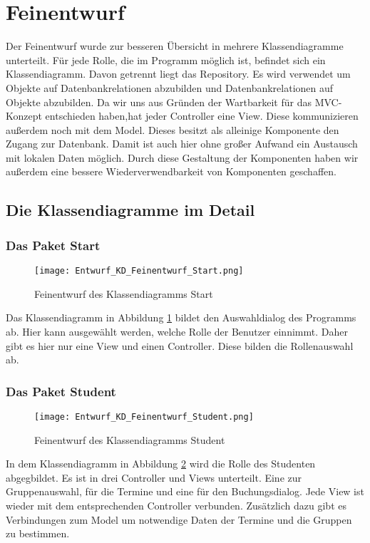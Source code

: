 \documentclass[a4paper,10pt]{article}
\begin{document}
  \newpage
\section{Feinentwurf}
Der Feinentwurf wurde zur besseren Übersicht in mehrere Klassendiagramme unterteilt. Für jede Rolle, die im Programm möglich ist, befindet sich ein Klassendiagramm.
Davon getrennt liegt das Repository. Es wird verwendet um Objekte auf Datenbankrelationen abzubilden und Datenbankrelationen auf Objekte abzubilden. Da wir uns aus Gründen der Wartbarkeit für das MVC-Konzept entschieden haben,hat jeder Controller eine View.
Diese kommunizieren außerdem noch mit dem Model. Dieses besitzt als alleinige Komponente den Zugang zur Datenbank. Damit ist auch hier ohne großer Aufwand ein Austausch mit lokalen Daten möglich.
Durch diese Gestaltung der Komponenten haben wir außerdem eine bessere Wiederverwendbarkeit von Komponenten geschaffen. 

 \subsection{Die Klassendiagramme im Detail}
 \subsubsection{Das Paket Start}
 
 \begin{figure}
  \texttt{[image: Entwurf\_KD\_Feinentwurf\_Start.png]}
  \label{fig:Klassendiagramm_Start}
  \caption{Feinentwurf des Klassendiagramms Start}
 \end{figure} 
 
 Das Klassendiagramm in Abbildung \ref{fig:Klassendiagramm_Start} bildet den Auswahldialog des Programms ab. Hier kann ausgewählt werden, welche Rolle der Benutzer einnimmt. 
 Daher gibt es hier nur eine View und einen Controller. Diese bilden die Rollenauswahl ab.
 \subsubsection{Das Paket Student}
 
 \begin{figure}
\texttt{[image: Entwurf\_KD\_Feinentwurf\_Student.png]}
\label{fig:Klassendiagramm_Student}
\caption{Feinentwurf des Klassendiagramms Student}
 \end{figure} 

 In dem Klassendiagramm in Abbildung \ref{fig:Klassendiagramm_Student} wird die Rolle des Studenten abgegbildet. Es ist in drei Controller und Views unterteilt. Eine zur Gruppenauswahl, für die Termine und eine für den Buchungsdialog.
 Jede View ist wieder mit dem entsprechenden Controller verbunden. Zusätzlich dazu gibt es Verbindungen zum Model um notwendige Daten der Termine und die Gruppen zu bestimmen.
\end{document}
